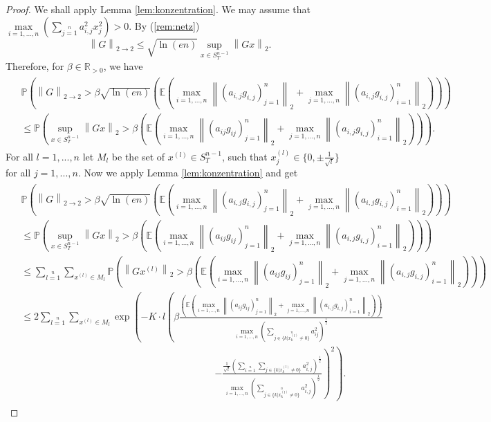 \documentclass[12pt,a4paper]{article}
\newcommand{\R}{\ensuremath{{\mathbb R}}}
\newcommand{\Pv}{\mathbb{P}}
\newcommand{\Ex}{\mathbb{E}}
\newcommand{\norm}[1]{\left \lVert#1 \right\rVert}
\begin{document}
\begin{proof} We shall apply Lemma \ref{lem:konzentration}. We may assume that
$\max\limits_{i=1,...,n}\left(\sum\limits_{j=1}\limits^na_{i,j}^2x_j^2\right)>0$.
By (\ref{rem:netz})  
	$$
	\norm{G}_{2\rightarrow 2}
	\leq  \sqrt{\ln(en)}\sup\limits_{x\in S_{T}^{n-1}}\norm{Gx}_2.$$
Therefore, for $\beta\in\R_{>0}$, we have
\begin{eqnarray*}
	\left.\begin{split}
	& \Pv\left(\norm{G}_{2\rightarrow 2}>\beta  \sqrt{\ln(en)}
\left(\Ex\left(\max\limits_{i=1,...,n}\norm{(a_{i,j}g_{i,j})_{j=1}^n}_2+
\max\limits_{j=1,...,n}\norm{(a_{i,j}g_{i,j})_{i=1}^n}_2\right)\right)\right)\\
& \leq \Pv\left( \sup\limits_{x\in S_{T}^{n-1}}\norm{Gx}_2>\beta
\left(\Ex\left(\max\limits_{i=1,...,n}\norm{(a_{ij}g_{ij})_{j=1}^n}_2+
\max\limits_{j=1,...,n}\norm{(a_{i,j}g_{i,j})_{i=1}^n}_2\right)\right)
\right).
\end{split}\right.
\end{eqnarray*}
For all $l=1,...,n$ let $M_l$ be the set of $x^{(l)}\in S_T^{n-1}$, 
such that $x^{(l)}_j\in\{0,\pm\frac{1}{\sqrt{l}}\}$ for all $j=1,...,n$. Now we apply Lemma \ref{lem:konzentration} and get
\begin{eqnarray*}
\left.\begin{split}
& \Pv\left(\norm{G}_{2\rightarrow 2}>\beta   \sqrt{\ln(en)}
\left(\Ex\left(\max\limits_{i=1,...,n}\norm{(a_{i,j}g_{i,j})_{j=1}^n}_2+
\max\limits_{j=1,...,n}\norm{(a_{i,j}g_{i,j})_{i=1}^n}_2\right)\right)\right)\\
& \leq \Pv\left( \sup\limits_{x\in S_{T}^{n-1}}\norm{Gx}_2>\beta
\left(\Ex\left(\max\limits_{i=1,...,n}\norm{(a_{ij}g_{ij})_{j=1}^n}_2+
\max\limits_{j=1,...,n}\norm{(a_{i,j}g_{i,j})_{i=1}^n}_2\right)\right)
\right)\\
& \leq\sum\limits_{l=1}\limits^n\sum\limits_{x^{(l)}\in M_l}
\Pv\left(\norm{Gx^{(l)}}_2>\beta
\left(\Ex\left(\max\limits_{i=1,...,n}\norm{(a_{ij}g_{ij})_{j=1}^n}_2+
\max\limits_{j=1,...,n}\norm{(a_{i,j}g_{i,j})_{i=1}^n}_2\right)\right)
\right)\\
& \leq2\sum\limits_{l=1}\limits^n \sum\limits_{x^{(l)}\in M_l}\exp\left(-K\cdot l\left(\beta\frac{\left(\Ex\left(\max\limits_{i=1,...,n}\norm{(a_{ij}g_{ij})_{j=1}^n}_2+
\max\limits_{j=1,...,n}\norm{(a_{i,j}g_{i,j})_{i=1}^n}_2\right)\right)}{\max\limits_{i=1,...,n}\left(\sum\limits_{j\in\{k|x_k^{(l)}\neq 0\}}\limits^na_{ij}^2\right)^{\frac{1}{2}}}\right.\right.\\
& \quad\quad\quad\quad\quad\quad\quad\quad\quad\quad\quad\quad\quad\quad\quad\quad\quad\quad\quad\quad\left.\left.-\frac{\frac{1}{\sqrt{l}}\left(\sum\limits_{i=1}\limits^n\sum\limits_{j\in\{k|x_k^{(l)}\neq 0\}}a_{i,j}^2\right)^{\frac{1}{2}}}{\max\limits_{i=1,...,n}\left(\sum\limits_{j\in\{k|x_k^{(l)}\neq 0\}}\limits^na_{i,j}^2\right)^{\frac{1}{2}}}\right)^2\right).

\end{split}
\end{eqnarray*}
\end{proof}
\end{document}
